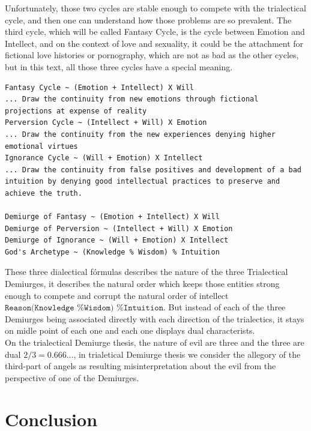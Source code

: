 \documentclass[12pt,a4paper]{article}
\begin{document}
Unfortunately, those two cycles are stable enough to compete with the trialectical cycle, and then one can understand how those problems are so prevalent. The third cycle, which will be called Fantasy Cycle, is the cycle between Emotion and Intellect, and on the context of love and sexuality, it could be the attachment for fictional love histories or pornography, which are not as bad as the other cycles, but in this text, all those three cycles have a special meaning.\\

\begin{lstlisting}
Fantasy Cycle ~ (Emotion + Intellect) X Will
... Draw the continuity from new emotions through fictional projections at expense of reality
Perversion Cycle ~ (Intellect + Will) X Emotion 
... Draw the continuity from the new experiences denying higher emotional virtues
Ignorance Cycle ~ (Will + Emotion) X Intellect
... Draw the continuity from false positives and development of a bad intuition by denying good intellectual practices to preserve and achieve the truth.

Demiurge of Fantasy ~ (Emotion + Intellect) X Will 
Demiurge of Perversion ~ (Intellect + Will) X Emotion 
Demiurge of Ignorance ~ (Will + Emotion) X Intellect
God's Archetype ~ (Knowledge % Wisdom) % Intuition
\end{lstlisting}

\hspace{\baselineskip}

These three dialectical fórmulas describes the nature of the three Trialectical Demiurges, it describes the natural order which keeps those entities strong enough to compete and corrupt the natural order of intellect $\texttt{Reason(Knowledge \% Wisdom) \% Intuition}$. But instead of each of the three Demiurges being associated directly with each direction of the trialectics, it stays on midle point of each one and each one displays dual characterists.\\ 

On the trialectical Demiurge thesis, the nature of evil are three and the three are dual $2/3=0.666 \dots$, in trialetical Demiurge thesis we consider the allegory of the third-part of angels as resulting misinterpretation about the evil from the perspective of one of the Demiurges.

\section{Conclusion}
\end{document}
